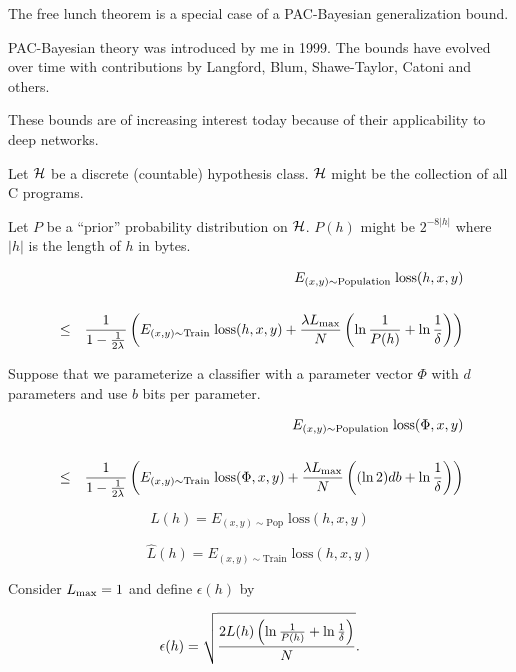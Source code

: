 {

The free lunch theorem is a special case of a PAC-Bayesian generalization bound.

\vfill
PAC-Bayesian theory was introduced by me in 1999. The bounds have evolved over time
with contributions by Langford, Blum, Shawe-Taylor, Catoni and others.

\vfill
These bounds are of increasing interest today because of their applicability to deep networks.


Let ${\cal H}$ be a discrete (countable) hypothesis class.  ${\cal H}$ might be the collection of all C programs.

\vfill
Let $P$ be a ``prior'' probability distribution on ${\cal H}$.  $P(h)$ might be $2^{-8|h|}$ where $|h|$ is the length of $h$ in bytes.

\vfill
\begin{eqnarray*}
  & & E_{(x,y)\sim \mathrm{Population}}\;\mathrm{loss}(h,x,y) \\
  \\
  & \leq & \frac{1}{1-\frac{1}{2\lambda}}\left(E_{(x,y) \sim \mathrm{Train}}\;\mathrm{loss}(h,x,y)
    + \frac{\lambda L_\mathrm{max}}{N}\left(\ln\frac{1}{P(h)} + \ln\frac{1}{\delta}\right)\right)
\end{eqnarray*}


Suppose that we parameterize a classifier with a parameter vector $\Phi$ with $d$ parameters and use $b$ bits per parameter.

\vfill
\begin{eqnarray*}
  & & E_{(x,y)\sim \mathrm{Population}}\;\mathrm{loss}(\Phi,x,y) \\
  \\
  & \leq & \frac{1}{1-\frac{1}{2\lambda}}\left(E_{(x,y) \sim \mathrm{Train}}\;\mathrm{loss}(\Phi,x,y)
    + \frac{\lambda L_\mathrm{max}}{N}\left((\ln 2)db + \ln\frac{1}{\delta}\right)\right)
\end{eqnarray*}

$$L(h) = E_{(x,y)\sim \mathrm{Pop}}\;\mathrm{loss}(h,x,y)$$

\vfill
$$\hat{L}(h) = E_{(x,y)\sim \mathrm{Train}}\;\mathrm{loss}(h,x,y)$$


Consider $L_{\max} = 1$ and define $\epsilon(h)$ by

\vfill
$$\epsilon(h) = \sqrt{\frac{2L(h)\left(\ln\frac{1}{P(h)} + \ln\frac{1}{\delta}\right)}{N}}.$$

}
